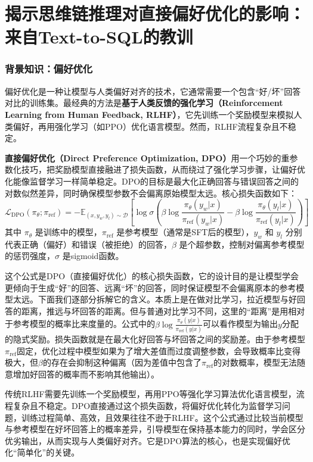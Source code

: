 \chapter{揭示思维链推理对直接偏好优化的影响：来自Text-to-SQL的教训}

\subsection{背景知识：偏好优化}
偏好优化是一种让模型与人类偏好对齐的技术，它通常需要一个包含“好/坏”回答对比的训练集。最经典的方法是\textbf{基于人类反馈的强化学习（Reinforcement Learning from Human Feedback, RLHF）}，它先训练一个奖励模型来模拟人类偏好，再用强化学习（如PPO）优化语言模型。然而，RLHF流程复杂且不稳定。

\textbf{直接偏好优化（Direct Preference Optimization, DPO）}用一个巧妙的重参数化技巧，把奖励模型直接融进了损失函数，从而绕过了强化学习步骤，让偏好优化能像监督学习一样简单稳定。DPO的目标是最大化正确回答与错误回答之间的对数似然差异，同时确保模型参数不会偏离原始模型太远。核心损失函数如下：
\[
\mathcal{L}_{\mathrm{DPO}}(\pi_{\theta}; \pi_{\mathrm{ref}}) = -\mathbb{E}_{(x,y_w,y_l)\sim\mathcal{D}} \left[ \log \sigma \left( \beta \log \frac{\pi_{\theta}(y_w|x)}{\pi_{\mathrm{ref}}(y_w|x)} - \beta \log \frac{\pi_{\theta}(y_l|x)}{\pi_{\mathrm{ref}}(y_l|x)} \right) \right]
\]
其中 \(\pi_{\theta}\) 是训练中的模型，\(\pi_{\mathrm{ref}}\) 是参考模型（通常是SFT后的模型），\(y_w\) 和 \(y_l\) 分别代表正确（偏好）和错误（被拒绝）的回答，\(\beta\) 是个超参数，控制对偏离参考模型的惩罚强度，\(\sigma\) 是sigmoid函数。

这个公式是DPO（直接偏好优化）的核心损失函数，它的设计目的是让模型学会更倾向于生成“好”的回答、远离“坏”的回答，同时保证模型不会偏离原本的参考模型太远。下面我们逐部分拆解它的含义。本质上是在做对比学习，拉近模型与好回答的距离，推远与坏回答的距离。但与普通对比学习不同，这里的“距离”是用相对于参考模型的概率比来度量的。公式中的\(\beta \log \frac{\pi_{\theta}(y|x)}{\pi_{\mathrm{ref}}(y|x)}\)可以看作模型为输出\(y\)分配的隐式奖励。损失函数就是在最大化好回答与坏回答之间的奖励差。由于参考模型\(\pi_{\mathrm{ref}}\)固定，优化过程中模型如果为了增大差值而过度调整参数，会导致概率比变得极大，但\(\beta\)的存在会抑制这种偏离（因为差值中包含了\(\pi_{\mathrm{ref}}\)的对数概率，模型无法随意增加好回答的概率而不影响其他输出）。

传统RLHF需要先训练一个奖励模型，再用PPO等强化学习算法优化语言模型，流程复杂且不稳定。DPO直接通过这个损失函数，将偏好优化转化为监督学习问题，训练过程简单、高效，且效果往往不逊于RLHF。这个公式通过比较当前模型与参考模型在好坏回答上的概率差异，引导模型在保持基本能力的同时，学会区分优劣输出，从而实现与人类偏好对齐。它是DPO算法的核心，也是实现偏好优化“简单化”的关键。

